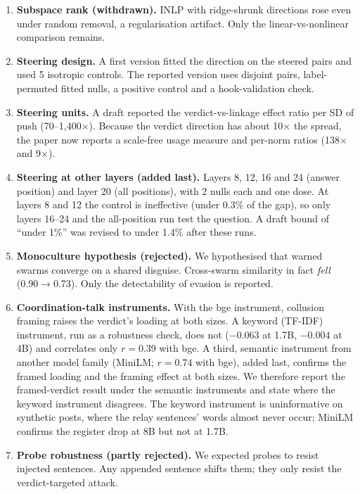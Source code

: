 \documentclass[10.5pt]{article}
\begin{document}
\begin{enumerate}
\begin{itemize}
  \item \emph{Stability of the linkage coordinate across prompts.} It was weaker than a permuted-label control.
  \end{itemize}
  The paper now reports only out-of-fold AUROCs and shifts in within-class SD.
\item \textbf{Subspace rank (withdrawn).} INLP with ridge-shrunk directions rose even under random removal, a regularisation artifact. Only the linear-vs-nonlinear comparison remains.
\item \textbf{Steering design.} A first version fitted the direction on the steered pairs and used 5 isotropic controls. The reported version uses disjoint pairs, label-permuted fitted nulls, a positive control and a hook-validation check.
\item \textbf{Steering units.} A draft reported the verdict-vs-linkage effect ratio per SD of push (70--1,400$\times$). Because the verdict direction has about 10$\times$ the spread, the paper now reports a scale-free usage measure and per-norm ratios (138$\times$ and 9$\times$).
\item \textbf{Steering at other layers (added last).} Layers 8, 12, 16 and 24 (answer position) and layer 20 (all positions), with 2 nulls each and one dose. At layers 8 and 12 the control is ineffective (under 0.3\% of the gap), so only layers 16--24 and the all-position run test the question. A draft bound of ``under 1\%'' was revised to under 1.4\% after these runs.
\item \textbf{Monoculture hypothesis (rejected).} We hypothesised that warned swarms converge on a shared disguise. Cross-swarm similarity in fact \emph{fell} (0.90$\to$0.73). Only the detectability of evasion is reported.
\item \textbf{Coordination-talk instruments.} With the bge instrument, collusion framing raises the verdict's loading at both sizes. A keyword (TF-IDF) instrument, run as a robustness check, does not ($-0.063$ at 1.7B, $-0.004$ at 4B) and correlates only $r=0.39$ with bge. A third, semantic instrument from another model family (MiniLM; $r=0.74$ with bge), added last, confirms the framed loading and the framing effect at both sizes. We therefore report the framed-verdict result under the semantic instruments and state where the keyword instrument disagrees. The keyword instrument is uninformative on synthetic posts, where the relay sentences' words almost never occur; MiniLM confirms the register drop at 8B but not at 1.7B.
\item \textbf{Probe robustness (partly rejected).} We expected probes to resist injected sentences. Any appended sentence shifts them; they only resist the verdict-targeted attack.
\end{enumerate}
\end{document}

